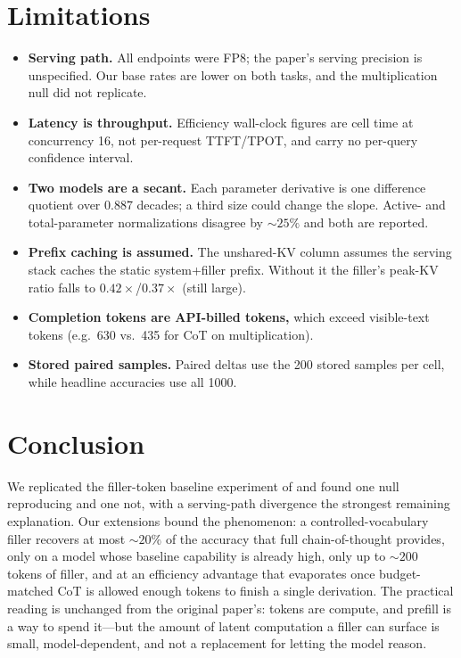 \documentclass[11pt,a4paper]{article}
\begin{document}
\section{Limitations}
\label{sec:limitations}
\begin{itemize}
    \item \textbf{Serving path.} All endpoints were FP8; the paper's serving
    precision is unspecified. Our base rates are lower on both tasks, and the
    multiplication null did not replicate.
    \item \textbf{Latency is throughput.} Efficiency wall-clock figures are
    cell time at concurrency 16, not per-request TTFT/TPOT, and carry no
    per-query confidence interval.
    \item \textbf{Two models are a secant.} Each parameter derivative is one
    difference quotient over 0.887 decades; a third size could change the
    slope. Active- and total-parameter normalizations disagree by ${\sim}25\%$
    and both are reported.
    \item \textbf{Prefix caching is assumed.} The unshared-KV column assumes
    the serving stack caches the static system+filler prefix. Without it the
    filler's peak-KV ratio falls to $0.42\times$/$0.37\times$ (still large).
    \item \textbf{Completion tokens are API-billed tokens,} which exceed
    visible-text tokens (e.g.\ 630 vs.\ 435 for CoT on multiplication).
    \item \textbf{Stored paired samples.} Paired deltas use the 200 stored
    samples per cell, while headline accuracies use all 1000.
\end{itemize}

\section{Conclusion}
We replicated the filler-token baseline experiment of
\citet{baherwani2026not} and found one null reproducing and one not, with a
serving-path divergence the strongest remaining explanation. Our extensions
bound the phenomenon: a controlled-vocabulary filler recovers at most
${\sim}20\%$ of the accuracy that full chain-of-thought provides, only on a
model whose baseline capability is already high, only up to ${\sim}200$ tokens
of filler, and at an efficiency advantage that evaporates once budget-matched
CoT is allowed enough tokens to finish a single derivation. The practical
reading is unchanged from the original paper's: tokens are compute, and
prefill is a way to spend it---but the amount of latent computation a filler
can surface is small, model-dependent, and not a replacement for letting the
model reason.
\end{document}
